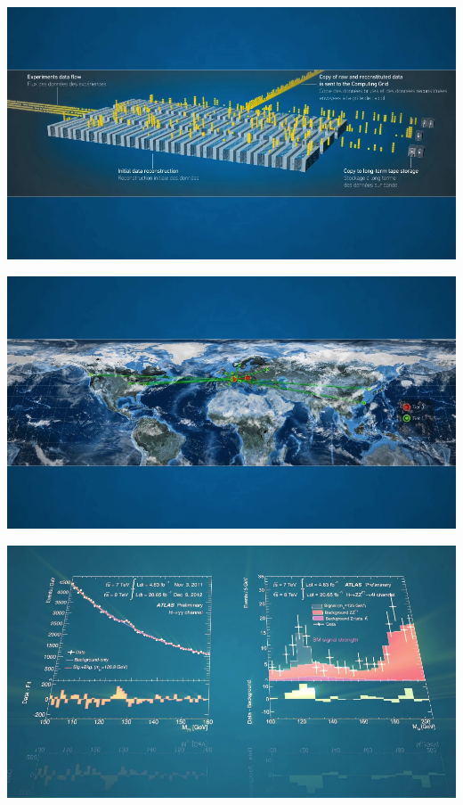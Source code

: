 \documentclass{beamer}
\begin{document}
\begin{frame}
    \includegraphics[width=\textwidth]{video/processing.png}
\end{frame}

\begin{frame}
    \includegraphics[width=\textwidth]{video/grid.png}
\end{frame}

\begin{frame}
    \includegraphics[width=\textwidth]{video/graphs.png}
\end{frame}
\end{document}

